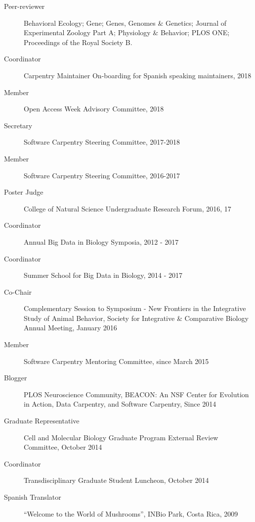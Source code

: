 \documentclass[margin,line]{CV}
\begin{document}
\begin{resume}
\begin{description}
\item[Peer-reviewer] Behavioral Ecology; Gene; Genes, Genomes \& Genetics; Journal of Experimental Zoology Part A; Physiology \& Behavior; PLOS ONE; Proceedings of the Royal Society B. 
\item[Coordinator] Carpentry Maintainer On-boarding for Spanish speaking maintainers, 2018
\item[Member] Open Access Week Advisory Committee, 2018
\item[Secretary] Software Carpentry Steering Committee, 2017-2018
\item[Member] Software Carpentry Steering Committee, 2016-2017
\item[Poster Judge] College of Natural Science Undergraduate Research Forum, 2016, 17
\item[Coordinator] Annual Big Data in Biology Symposia, 2012 - 2017 
\item[Coordinator] Summer School for Big Data in Biology, 2014 - 2017
\item[Co-Chair] Complementary Session to Symposium - New Frontiers in the Integrative Study of Animal Behavior, Society for Integrative \& Comparative Biology Annual Meeting, January 2016
\item[Member] Software Carpentry Mentoring Committee, since March 2015
\item[Blogger] PLOS Neuroscience Community, BEACON: An NSF Center for Evolution in Action, Data Carpentry, and Software Carpentry, Since 2014
\item[Graduate Representative] Cell and Molecular Biology Graduate Program External Review Committee, October 2014 
\item[Coordinator] Transdisciplinary Graduate Student Luncheon, October 2014
\item[Spanish Translator] “Welcome to the World of Mushrooms”, INBio Park, Costa Rica, 2009
\end{description}

    

\end{resume}
\end{document}
